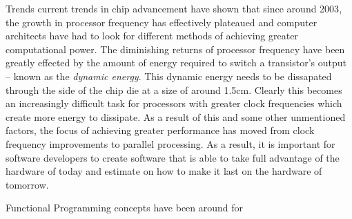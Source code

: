 \documentclass[12pt,twoside,notitlepage]{report}
\begin{document}
Trends current trends in chip advancement have shown that since around 2003\cite{hennessy2012}, the growth in processor frequency has effectively plateaued and computer architects have had to look for different methods of achieving
greater computational power. The diminishing returns of processor frequency have been greatly effected by the amount of energy required to switch a transistor's output -- known as the {\em dynamic energy}. This dynamic energy needs to
be dissapated through the side of the chip die at a size of around 1.5cm. Clearly this becomes an increasingly difficult task for processors with greater clock frequencies which create more energy to dissipate. As a result of this and
some other unmentioned factors, the focus of achieving greater performance has moved from clock frequency improvements to parallel processing. As a result, it is important for software developers to create software that is able to
take full advantage of the hardware of today and estimate on how to make it last on the hardware of tomorrow.

Functional Programming concepts have been around for
\end{document}
